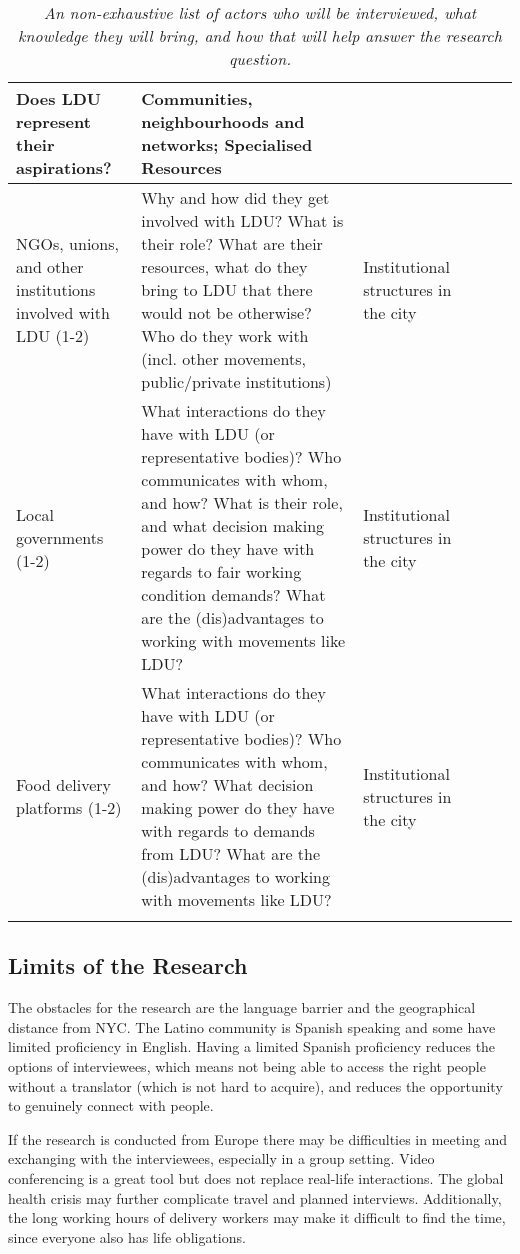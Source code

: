 \documentclass{article}[12pt]
\begin{document}
\begin{longtable}{ Lp{.35\textwidth} Lp{.60\textwidth} Lp{.4\textwidth}}
	Does LDU represent their aspirations?
	 &
	Communities, neighbourhoods and networks; Specialised Resources  \\ 
	\hline
	NGOs, unions, and other institutions involved with LDU (1-2) &
	Why and how did they get involved with LDU? What is their role? What are their resources, what do they bring to LDU that there would not be otherwise? Who do they work with (incl. other movements, public/private institutions)
	&
	Institutional structures in the city  \\ 
	\hline
	Local governments (1-2) &
	What interactions do they have with LDU (or representative bodies)? Who communicates with whom, and how? What is their role, and what decision making power do they have with regards to fair working condition demands? What are the (dis)advantages to working with movements like LDU? 
	&
	Institutional structures in the city  \\ 
	\hline
	Food delivery platforms (1-2) &
	What interactions do they have with LDU (or representative bodies)? Who communicates with whom, and how? What decision making power do they have with regards to demands from LDU? What are the (dis)advantages to working with movements like LDU? 
	&
	Institutional structures in the city  \\ 
\bottomrule
\caption{\textit{An non-exhaustive list of actors who will be interviewed, what knowledge they will bring, and how that will help answer the research question.}}
\label{interviews}
\end{longtable}

\subsection{Limits of the Research}

The obstacles for the research are the language barrier and the geographical distance from NYC. The Latino community is Spanish speaking and some have limited proficiency in English. Having a limited Spanish proficiency reduces the options of interviewees, which means not being able to access the right people without a translator (which is not hard to acquire), and reduces the opportunity to genuinely connect with people.

If the research is conducted from Europe there may be difficulties in meeting and exchanging with the interviewees, especially in a group setting. Video conferencing is a great tool but does not replace real-life interactions. The global health crisis may further complicate travel and planned interviews. Additionally, the long working hours of delivery workers may make it difficult to find the time, since everyone also has life obligations.
\end{document}
